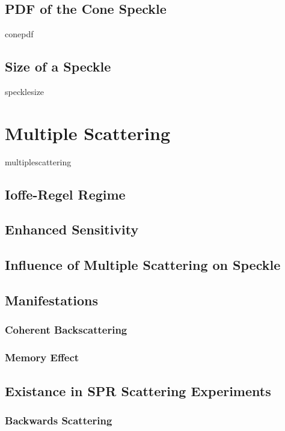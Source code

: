\documentclass[a4paper,titlepage,onecolumn]{report}
\begin{document}
  \subsection{PDF of the Cone Speckle}
                {conepdf}
                \subsection{Size of a Speckle}
                {specklesize}
                \section{Multiple Scattering} \label{sec:multiplescattering}
 {multiplescattering}
  \subsection{Ioffe-Regel Regime}
  \subsection{Enhanced Sensitivity}
  \subsection{Influence of Multiple Scattering on Speckle}
  \subsection{Manifestations}
   \subsubsection{Coherent Backscattering}
   \subsubsection{Memory Effect}
  \subsection{Existance in SPR Scattering Experiments}
   \subsubsection{Backwards Scattering}
\end{document}
